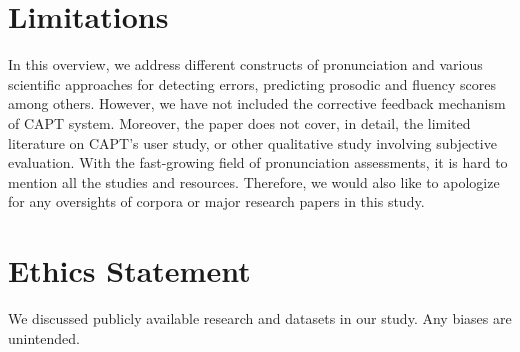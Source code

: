 \documentclass[11pt]{article}
\begin{document}
\section*{Limitations}
In this overview, we address different constructs of pronunciation and various scientific approaches for detecting errors, predicting prosodic and fluency scores among others. However, we have not included the corrective feedback mechanism of CAPT system. Moreover, the paper does not cover, in detail, the limited literature on CAPT's user study, or other qualitative study involving subjective evaluation.
With the fast-growing field of pronunciation assessments, it is hard to mention all the studies and resources. Therefore, we would also like to apologize for any oversights of corpora or major research papers in this study.

\section*{Ethics Statement}
We discussed publicly available research and datasets in our study. Any biases are unintended.






\end{document}
